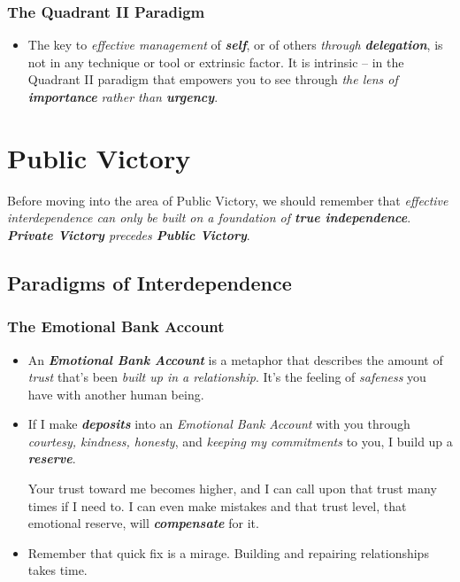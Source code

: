 \documentclass[11pt]{article}
\begin{document}
\subsubsection{The Quadrant II Paradigm}
\begin{itemize}
\item The key to \emph{effective management} of \emph{\textbf{self}}, or of others \emph{through \textbf{delegation}}, is not in any technique or tool or extrinsic factor. It is intrinsic -- in the Quadrant II paradigm that empowers you to see through \emph{the lens of \textbf{importance} rather than \textbf{urgency}}.
\end{itemize}
\section{Public Victory}
Before moving into the area of Public Victory, we should remember that \emph{effective interdependence can only be built on a foundation of \textbf{true independence}}. \emph{\textbf{Private Victory} precedes \textbf{Public Victory}}.
\subsection{Paradigms of Interdependence}
\subsubsection{The Emotional Bank Account}
\begin{itemize}
\item An \emph{\textbf{Emotional Bank Account}} is a metaphor that describes the amount of \emph{trust} that's been \emph{built up in a relationship}. It's the feeling of \emph{safeness} you have with another human being.

\item If I make \textbf{\emph{deposits}} into an \emph{Emotional Bank Account} with you through \emph{courtesy, kindness, honesty}, and \emph{keeping my commitments} to you, I build up a \emph{\textbf{reserve}}. 

Your trust toward me becomes higher, and I can call upon that trust many times if I need to. I can even make mistakes and that trust level, that emotional reserve, will \emph{\textbf{compensate}} for it. 

\item Remember that quick fix is a mirage. Building and repairing relationships takes time. 
\end{itemize}
\end{document}
